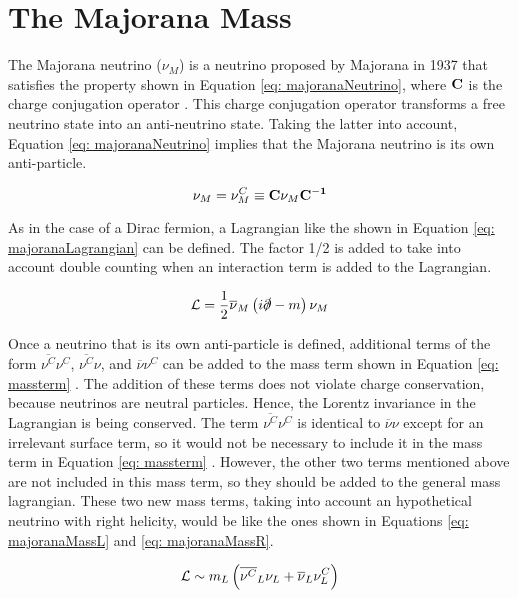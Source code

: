\section{The Majorana Mass}

The Majorana neutrino ($\nu_{M}$) is a neutrino proposed by Majorana in 1937 that satisfies the property shown in Equation \ref{eq: majoranaNeutrino}, where $\mathbf{C}$ is the charge conjugation operator \cite{NeutrinoMass}. This charge conjugation operator transforms a free neutrino state into an anti-neutrino state. Taking the latter into account, Equation \ref{eq: majoranaNeutrino} implies that the Majorana neutrino is its own anti-particle. 

\begin{equation}\label{eq: majoranaNeutrino}
\nu_{M} = \nu^{C}_{M} \equiv \mathbf{C}\nu_{M}\mathbf{C^{-1}}
\end{equation}

As in the case of a Dirac fermion, a Lagrangian like the shown in Equation \ref{eq: majoranaLagrangian} can be defined. The factor 1/2 is added to take into account double counting when an interaction term is added to the Lagrangian.   

\begin{equation}\label{eq: majoranaLagrangian}
\mathcal{L} = \frac{1}{2}\overline{\nu}_{M}\left(i\slashed{\partial} - m\right)\nu_{M}
\end{equation}

Once a neutrino that is its own anti-particle is defined, additional terms of the form $\overline{\nu^{C}}\nu^{C}$, $\overline{\nu^{C}}\nu$, and $\overline{\nu}\nu^{C}$ can be added to the mass term shown in Equation \ref{eq: massterm} \cite{NeutrinoMass}. The addition of these terms does not violate charge conservation, because neutrinos are neutral particles. Hence, the Lorentz invariance in the Lagrangian is being conserved. The term $\overline{\nu^{C}}\nu^{C}$ is identical to $\overline{\nu}\nu$ except for an irrelevant surface term, so it would not be necessary to include it in the mass term in Equation \ref{eq: massterm} \cite{NeutrinoMass}. However, the other two terms mentioned above are not included in this mass term, so they should be added to the general mass lagrangian. These two new mass terms, taking into account an hypothetical neutrino with right helicity, would be like the ones shown in Equations \ref{eq: majoranaMassL} and \ref{eq: majoranaMassR}.

\begin{equation}\label{eq: majoranaMassL}
\mathcal{L} \sim m_{L}\left(\overline{\nu^{C}}_{L}\nu_{L}  + \overline{\nu}_{L}\nu^{C}_{L}\right)
\end{equation}


